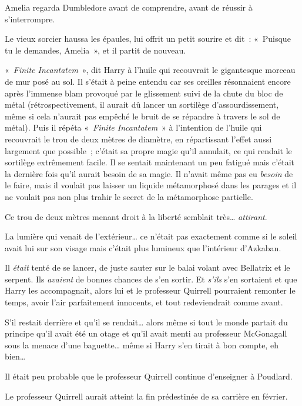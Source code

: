 Amelia regarda Dumbledore avant de comprendre, avant de réussir à s'interrompre.

Le vieux sorcier haussa les épaules, lui offrit un petit sourire et dit~: «~Puisque tu le demandes, Amelia~», et il partit de nouveau.

\later

«~\emph{Finite Incantatem}~», dit Harry à l'huile qui recouvrait le gigantesque morceau de mur posé au sol.
Il s'était à peine entendu car ses oreilles résonnaient encore après l'immense blam provoqué par le glissement suivi de la chute du bloc de métal (rétrospectivement, il aurait dû lancer un sortilège d'assourdissement, même si cela n'aurait pas empêché le bruit de se répandre à travers le sol de métal).
Puis il répéta «~\emph{Finite Incantatem}~» à l'intention de l'huile qui recouvrait le trou de deux mètres de diamètre, en répartissant l'effet aussi largement que possible~; c'était sa propre magie qu'il annulait, ce qui rendait le sortilège extrêmement facile.
Il se sentait maintenant un peu fatigué mais c'était la dernière fois qu'il aurait besoin de sa magie.
Il n'avait même pas eu \emph{besoin} de le faire, mais il voulait pas laisser un liquide métamorphosé dans les parages et il ne voulait pas non plus trahir le secret de la métamorphose partielle.

Ce trou de deux mètres menant droit à la liberté semblait très…
\emph{attirant}.

La lumière qui venait de l'extérieur… ce n'était pas exactement comme si le soleil avait lui sur son visage mais c'était plus lumineux que l'intérieur d'Azkaban.

Il \emph{était} tenté de se lancer, de juste sauter sur le balai volant avec Bellatrix et le serpent.
Ils \emph{avaient} de bonnes chances de s'en sortir.
Et \emph{s'ils} s'en sortaient et que Harry les accompagnait, alors lui et le professeur Quirrell pourraient remonter le temps, avoir l'air parfaitement innocents, et tout redeviendrait comme avant.

S'il restait derrière et qu'il se rendait… alors même si tout le monde partait du principe qu'il avait été un otage et qu'il avait menti au professeur McGonagall sous la menace d'une baguette… même si Harry s'en tirait à bon compte, eh bien…

Il était peu probable que le professeur Quirrell continue d'enseigner à Poudlard.

Le professeur Quirrell aurait atteint la fin prédestinée de sa carrière en février.

